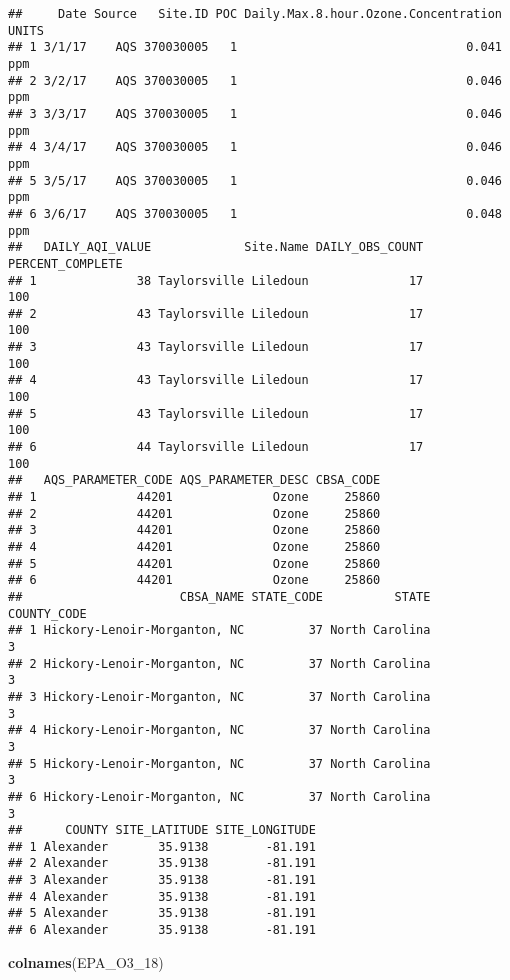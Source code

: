 \documentclass[]{article}
\newenvironment{Shaded}{\begin{snugshade}}{\end{snugshade}}
\newcommand{\KeywordTok}[1]{\textcolor[rgb]{0.13,0.29,0.53}{\textbf{#1}}}
\newcommand{\DecValTok}[1]{\textcolor[rgb]{0.00,0.00,0.81}{#1}}
\newcommand{\NormalTok}[1]{#1}
\begin{document}
\begin{verbatim}
##     Date Source   Site.ID POC Daily.Max.8.hour.Ozone.Concentration UNITS
## 1 3/1/17    AQS 370030005   1                                0.041   ppm
## 2 3/2/17    AQS 370030005   1                                0.046   ppm
## 3 3/3/17    AQS 370030005   1                                0.046   ppm
## 4 3/4/17    AQS 370030005   1                                0.046   ppm
## 5 3/5/17    AQS 370030005   1                                0.046   ppm
## 6 3/6/17    AQS 370030005   1                                0.048   ppm
##   DAILY_AQI_VALUE             Site.Name DAILY_OBS_COUNT PERCENT_COMPLETE
## 1              38 Taylorsville Liledoun              17              100
## 2              43 Taylorsville Liledoun              17              100
## 3              43 Taylorsville Liledoun              17              100
## 4              43 Taylorsville Liledoun              17              100
## 5              43 Taylorsville Liledoun              17              100
## 6              44 Taylorsville Liledoun              17              100
##   AQS_PARAMETER_CODE AQS_PARAMETER_DESC CBSA_CODE
## 1              44201              Ozone     25860
## 2              44201              Ozone     25860
## 3              44201              Ozone     25860
## 4              44201              Ozone     25860
## 5              44201              Ozone     25860
## 6              44201              Ozone     25860
##                      CBSA_NAME STATE_CODE          STATE COUNTY_CODE
## 1 Hickory-Lenoir-Morganton, NC         37 North Carolina           3
## 2 Hickory-Lenoir-Morganton, NC         37 North Carolina           3
## 3 Hickory-Lenoir-Morganton, NC         37 North Carolina           3
## 4 Hickory-Lenoir-Morganton, NC         37 North Carolina           3
## 5 Hickory-Lenoir-Morganton, NC         37 North Carolina           3
## 6 Hickory-Lenoir-Morganton, NC         37 North Carolina           3
##      COUNTY SITE_LATITUDE SITE_LONGITUDE
## 1 Alexander       35.9138        -81.191
## 2 Alexander       35.9138        -81.191
## 3 Alexander       35.9138        -81.191
## 4 Alexander       35.9138        -81.191
## 5 Alexander       35.9138        -81.191
## 6 Alexander       35.9138        -81.191
\end{verbatim}

\begin{Shaded}
\begin{Highlighting}[]
\KeywordTok{colnames}\NormalTok{(EPA_O3_}\DecValTok{18}\NormalTok{)}
\end{Highlighting}
\end{Shaded}
\end{document}
